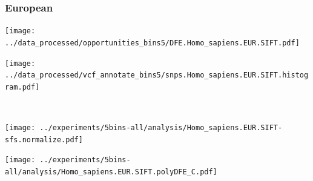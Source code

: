 \subsubsection{European}

\begin{minipage}{0.49\linewidth}
    \texttt{[image: ../data\_processed/opportunities\_bins5/DFE.Homo\_sapiens.EUR.SIFT.pdf]}
\end{minipage}
\begin{minipage}{0.49\linewidth}
    \texttt{[image: ../data\_processed/vcf\_annotate\_bins5/snps.Homo\_sapiens.EUR.SIFT.histogram.pdf]}
\end{minipage}
\\
\begin{minipage}{0.49\linewidth}
    \texttt{[image: ../experiments/5bins-all/analysis/Homo\_sapiens.EUR.SIFT-sfs.normalize.pdf]}
\end{minipage}
\begin{minipage}{0.4\linewidth}
    \texttt{[image: ../experiments/5bins-all/analysis/Homo\_sapiens.EUR.SIFT.polyDFE\_C.pdf]}
\end{minipage}
